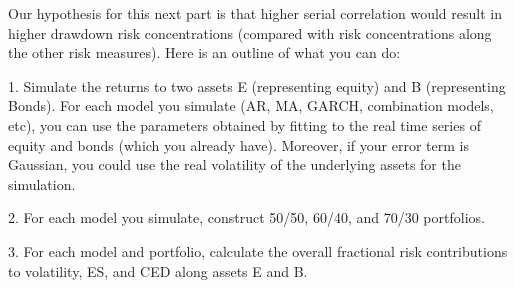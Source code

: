 \documentclass[11pt]{article}
\begin{document}
Our hypothesis for this next part is that higher serial correlation would result in higher drawdown risk concentrations (compared with risk concentrations along the other risk measures). Here is an outline of what you can do:

1. Simulate the returns to two assets E (representing equity) and B (representing Bonds). For each model you simulate (AR, MA, GARCH, combination models, etc), you can use the parameters obtained by fitting to the real time series of equity and bonds (which you already have). Moreover, if your error term is Gaussian, you could use the real volatility of the underlying assets for the simulation.

2. For each model you simulate, construct 50/50, 60/40, and 70/30 portfolios.

3. For each model and portfolio, calculate the overall fractional risk contributions to volatility, ES, and CED along assets E and B.
\end{document}
